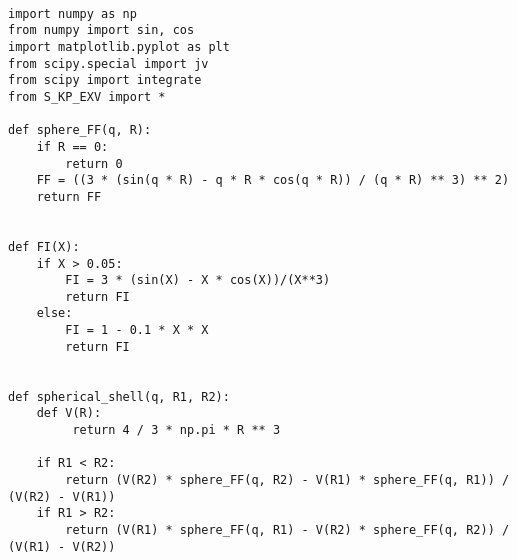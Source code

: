 \documentclass[a4paper, 12pt]{article}
\begin{document}
\renewcommand{\theFancyVerbLine}{
    \sffamily\textcolor[rgb]{0.5,0.5,0.5}{\scriptsize\arabic{FancyVerbLine}}}

\begin{verbatim}

import numpy as np
from numpy import sin, cos
import matplotlib.pyplot as plt
from scipy.special import jv
from scipy import integrate
from S_KP_EXV import *

def sphere_FF(q, R):
    if R == 0:
        return 0
    FF = ((3 * (sin(q * R) - q * R * cos(q * R)) / (q * R) ** 3) ** 2)
    return FF


def FI(X):
    if X > 0.05:
        FI = 3 * (sin(X) - X * cos(X))/(X**3)
        return FI
    else:
        FI = 1 - 0.1 * X * X
        return FI


def spherical_shell(q, R1, R2):
    def V(R):
         return 4 / 3 * np.pi * R ** 3

    if R1 < R2:
        return (V(R2) * sphere_FF(q, R2) - V(R1) * sphere_FF(q, R1)) / (V(R2) - V(R1))
    if R1 > R2:
        return (V(R1) * sphere_FF(q, R1) - V(R2) * sphere_FF(q, R2)) / (V(R1) - V(R2))
\end{verbatim}


%
%
    
\end{document}
